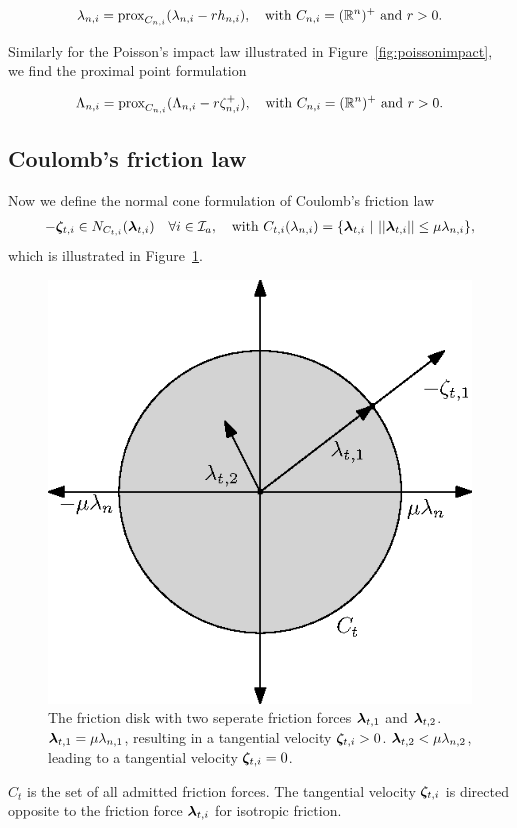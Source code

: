 \documentclass[DC2017114Bouma.tex]{subfiles}
\begin{document}
\begin{align}
\lambda_{n,i} = \operatorname{\text{prox}}_{C_{n,i}}(\lambda_{n,i} - rh_{n,i}),\quad \text{with }C_{n,i} = (\mathbb{R}^n)^+\text{ and } r>0.
\end{align}

Similarly for the Poisson's impact law illustrated in Figure~\ref{fig:poissonimpact}, we find the proximal point formulation

\begin{align}
\Lambda_{n,i} = \operatorname{\text{prox}}_{C_{n,i}}(\Lambda_{n,i} - r\zeta^+_{n,i}),\quad \text{with }C_{n,i} = (\mathbb{R}^n)^+\text{ and } r>0.
\end{align}

\subsection{Coulomb's friction law}
Now we define the normal cone formulation of Coulomb's friction law
\begin{align}
-\zetab_{t,i} \in N_{C_{t,i}}(\lambdab_{t,i})\quad \forall i\in\Ic_a,\quad \text{with }C_{t,i}(\lambda_{n,i}) = \{\lambdab_{t,i}\ |\ ||\lambdab_{t,i}|| \leq \mu\lambda_{n,i}\},
\end{align}
which is illustrated in Figure~\ref{fig:frictiondisk}.  

\begin{figure}[h]
\centering
\includegraphics[width=.4\textwidth]{frictiondisk.eps}\caption{The friction disk with two seperate friction forces $\boldsymbol{\lambda}_{t,1}$ and $\boldsymbol{\lambda}_{t,2}$. $\boldsymbol{\lambda}_{t,1} = \mu\lambda_{n,1}$, resulting in a tangential velocity $\boldsymbol{\zeta}_{t,i}>0$. $\boldsymbol{\lambda}_{t,2}<\mu\lambda_{n,2}$, leading to a tangential velocity $\boldsymbol{\zeta}_{t,i}=0$.}\label{fig:frictiondisk}
\end{figure}

$C_t$ is the set of all admitted friction forces. The tangential velocity $\boldsymbol{\zeta}_{t,i}$ is directed opposite to the friction force $\boldsymbol{\lambda}_{t,i}$ for isotropic friction. 
\end{document}
